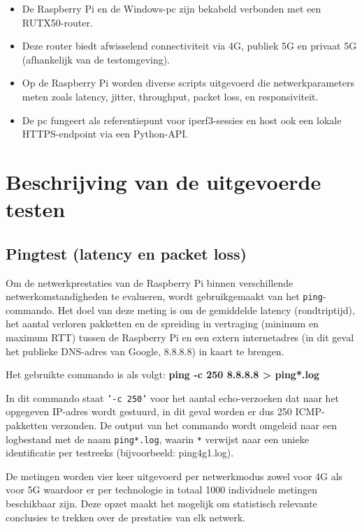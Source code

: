\begin{itemize}
    \item De Raspberry Pi en de Windows-pc zijn bekabeld verbonden met een RUTX50-router.
    \item Deze router biedt afwisselend connectiviteit via 4G, publiek 5G en privaat 5G (afhankelijk van de testomgeving).
    \item Op de Raspberry Pi worden diverse scripts uitgevoerd die netwerkparameters meten zoals latency, jitter, throughput, packet loss, en responsiviteit.
    \item De pc fungeert als referentiepunt voor iperf3-sessies en host ook een lokale HTTPS-endpoint via een Python-API.
\end{itemize}

\section{Beschrijving van de uitgevoerde testen}

\subsection{Pingtest (latency en packet loss)}
Om de netwerkprestaties van de Raspberry Pi binnen verschillende netwerkomstandigheden te evalueren, wordt gebruikgemaakt van het \texttt{ping}-commando. Het doel van deze meting is om de gemiddelde latency (rondtriptijd), het aantal verloren pakketten en de spreiding in vertraging (minimum en maximum RTT) tussen de Raspberry Pi en een extern internetadres (in dit geval het publieke DNS-adres van Google, 8.8.8.8) in kaart te brengen.

Het gebruikte commando is als volgt: \textbf{ping -c 250 8.8.8.8 > ping*.log}

In dit commando staat \texttt{'-c 250'} voor het aantal echo-verzoeken dat naar het opgegeven IP-adres wordt gestuurd, in dit geval worden er dus 250 ICMP-pakketten verzonden. De output van het commando wordt omgeleid naar een logbestand met de naam \texttt{ping*.log}, waarin \texttt{*} verwijst naar een unieke identificatie per testreeks (bijvoorbeeld: ping4g1.log).

De metingen worden vier keer uitgevoerd per netwerkmodus zowel voor 4G als voor 5G waardoor er per technologie in totaal 1000 individuele metingen beschikbaar zijn. Deze opzet maakt het mogelijk om statistisch relevante conclusies te trekken over de prestaties van elk netwerk.

